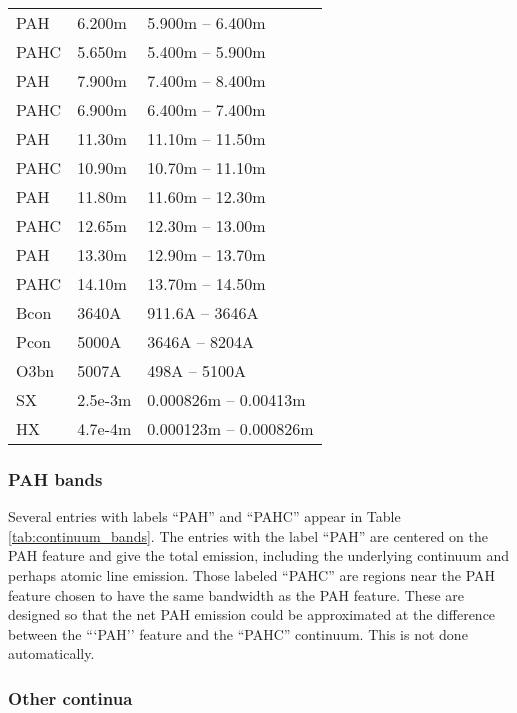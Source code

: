 \begin{table}
\begin{tabular}{lll}
 PAH  & 6.200m & 5.900m -- 6.400m\\ 
 PAHC & 5.650m & 5.400m -- 5.900m\\ 
 PAH  & 7.900m & 7.400m -- 8.400m\\ 
 PAHC & 6.900m & 6.400m -- 7.400m\\ 
 PAH  & 11.30m & 11.10m -- 11.50m\\ 
 PAHC & 10.90m & 10.70m -- 11.10m\\ 
 PAH  & 11.80m & 11.60m -- 12.30m\\ 
 PAHC & 12.65m & 12.30m -- 13.00m\\ 
 PAH  & 13.30m & 12.90m -- 13.70m\\ 
 PAHC & 14.10m & 13.70m -- 14.50m\\ 
 Bcon &  3640A & 911.6A --  3646A\\ 
 Pcon &  5000A &  3646A --  8204A\\ 
 O3bn &  5007A &  498A     -- 5100A \\
SX      & 2.5e-3m  & 0.000826m -- 0.00413m \\
HX      & 4.7e-4m  & 0.000123m -- 0.000826m  \\
\hline
\end{tabular}
\end{table}

\subsubsection{PAH bands}

Several entries with labels ``PAH'' and ``PAHC'' appear in Table \ref{tab:continuum_bands}.
The entries with the label ``PAH'' are centered on the PAH feature and give
the total emission, including the underlying continuum and perhaps atomic
line emission. 
Those labeled ``PAHC'' are regions near the PAH feature chosen to have the same bandwidth
as the PAH feature. 
These are designed so that the net PAH emission could be
approximated at the difference between the ```PAH'' feature and the ``PAHC'' continuum.
This is not done automatically.

\subsubsection{Other continua}

